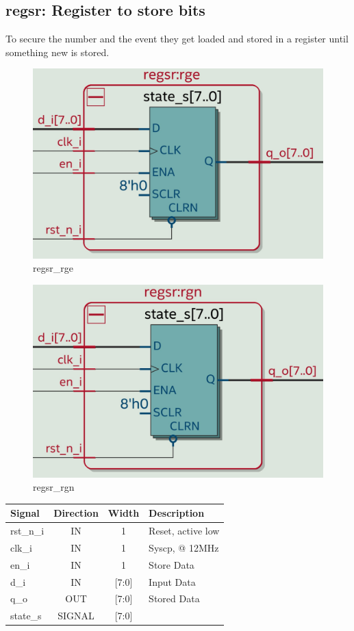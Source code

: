 \documentclass[12pt,a4 paper] {report}
\begin{document}
\subsection{regsr: Register to store bits}
To secure the number and the event they get loaded and stored in a register until something new is stored.
\begin{figure}[h]
	\centering	
	\includegraphics[scale=0.12]{../png/regsr_rge.png}
	\caption{regsr\_rge}
\end{figure}
\begin{figure}[h]
	\centering	
	\includegraphics[scale=0.12]{../png/regsr_rgn.png}
	\caption{regsr\_rgn}
\end{figure}
\begin{center}
	\begin{tabular}{ | p{2cm} | c | c | p{5cm} |}
		\hline
		\textbf{Signal} & \textbf{Direction} & \textbf{Width} & \textbf{Description} \\
		\hline
		\hline
 		rst\_n\_i & IN & 1 & Reset, active low \\
 		\hline
		clk\_i & IN & 1 & Syscp, @ 12MHz \\
		\hline
		en\_i & IN & 1 & Store Data \\
		\hline
		d\_i & IN & [7:0] & Input Data \\
		\hline
		q\_o & OUT & [7:0] & Stored Data \\
		\hline
		\hline
		state\_s & SIGNAL & [7:0] & \\
		\hline
	\end{tabular}
\end{center}
\end{document}

